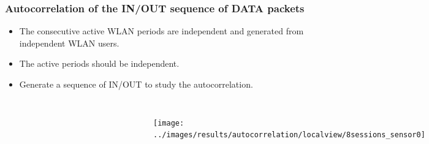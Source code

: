 \documentclass[9pt,handout,serif]{beamer}
\begin{document}
\begin{frame}[c]
	\frametitle{Autocorrelation of the IN/OUT sequence of DATA packets}
	\begin{itemize}
		\item The consecutive active WLAN periods are independent and generated from independent WLAN users.
		\item The active periods should be independent.
		\item Generate a sequence of IN/OUT to study the autocorrelation.
	\end{itemize}
	
	\begin{columns}
		\begin{figure}
			\centering
			\includegraphics[width=0.5\textwidth]{../images/results/autocorrelation/localview/8sessions}
		\end{figure}
		\begin{figure}
			\centering
			\includegraphics[width=0.5\textwidth]{../images/results/autocorrelation/localview/15sessions}
		\end{figure}
		
		\begin{columns}
			\begin{figure}
				\centering
				\texttt{[image: ../images/results/autocorrelation/localview/8sessions\_sensor0]}
			\end{figure}
			\begin{figure}
				\centering
				\texttt{[image: ../images/results/autocorrelation/localview/8sessions\_sensor1]}
			\end{figure}
			\begin{figure}
				\centering
				\texttt{[image: ../images/results/autocorrelation/localview/8sessions\_sensor2]}
			\end{figure}
		\end{columns}
		

\end{columns}
\end{frame}
\end{document}

